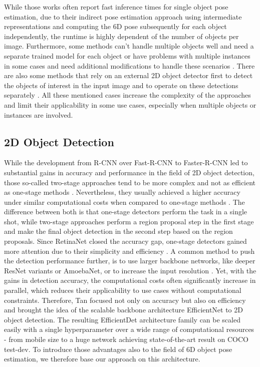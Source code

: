\documentclass[twocolumn, 10pt, letterpaper]{article}
\begin{document}
While those works often report fast inference times for single object pose estimation, due to their indirect pose estimation approach using intermediate representations and computing the 6D pose subsequently for each object independently, the runtime is highly dependent of the number of objects per image. Furthermore, some methods can't handle multiple objects well and need a separate trained model for each object \cite{Pix2Pose}\cite{DOPE} or have problems with multiple instances in some cases and need additional modifications to handle these scenarios \cite{DPOD}. There are also some methods that rely on an external 2D object detector first to detect the objects of interest in the input image and to operate on these detections separately \cite{CDPN}\cite{Pix2Pose}. All these mentioned cases increase the complexity of the approaches and limit their applicability in some use cases, especially when multiple objects or instances are involved.

\subsection{2D Object Detection}
\label{subsection_2d_object_detection}
While the development from R-CNN\cite{RCNN} over Fast-R-CNN\cite{FastRCNN} to Faster-R-CNN\cite{FasterRCNN} led to substantial gains in accuracy and performance in the field of 2D object detection, those so-called two-stage approaches tend to be more complex and not as efficient as one-stage methods \cite{EfficientDet}. Nevertheless, they usually achieved a higher accuracy under similar computational costs when compared to one-stage methods \cite{RetinaNet}. The difference between both is that one-stage detectors perform the task in a single shot, while two-stage approaches perform a region proposal step in the first stage and make the final object detection in the second step based on the region proposals. Since RetinaNet\cite{RetinaNet} closed the accuracy gap, one-stage detectors gained more attention due to their simplicity and efficiency \cite{EfficientDet}. A common method to push the detection performance further, is to use larger backbone networks, like deeper ResNet\cite{ResNet} variants or AmoebaNet\cite{AmoebaNet}, or to increase the input resolution \cite{YOLOv3}\cite{AmoebaNet_NAS_FPN}. Yet, with the gains in detection accuracy, the computational costs often significantly increase in parallel, which reduces their applicability to use cases without computational constraints. Therefore, Tan \etal\cite{EfficientDet} focused not only on accuracy but also on efficiency and brought the idea of the scalable backbone architecture EfficientNet\cite{EfficientNet} to 2D object detection. The resulting EfficientDet architecture family can be scaled easily with a single hyperparameter over a wide range of computational resources - from mobile size to a huge network achieving state-of-the-art result on COCO test-dev\cite{COCO}. To introduce those advantages also to the field of 6D object pose estimation, we therefore base our approach on this architecture.
\end{document}
